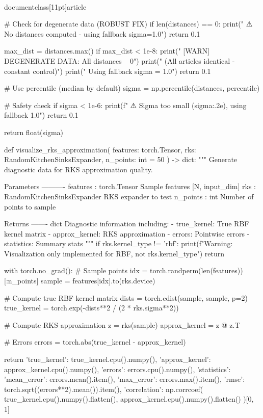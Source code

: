 \\documentclass[11pt]{article}
\begin{document}
\begin{CodeBlock}
    # Check for degenerate data (ROBUST FIX)
    if len(distances) == 0:
        print("  ⚠ No distances computed - using fallback sigma=1.0")
        return 0.1
    
    max_dist = distances.max()
    if max_dist < 1e-8:
        print("  [WARN] DEGENERATE DATA: All distances ~ 0")
        print("    (All articles identical - constant control)")
        print("    Using fallback sigma = 1.0")
        return 0.1
    
    # Use percentile (median by default)
    sigma = np.percentile(distances, percentile)
    
    # Safety check
    if sigma < 1e-6:
        print(f"  ⚠ Sigma too small ({sigma:.2e}), using fallback 1.0")
        return 0.1
    
    return float(sigma)


def visualize_rks_approximation(
    features: torch.Tensor,
    rks: RandomKitchenSinksExpander,
    n_points: int = 50
) -> dict:
    """
    Generate diagnostic data for RKS approximation quality.
    
    Parameters
    ----------
    features : torch.Tensor
        Sample features [N, input_dim]
    rks : RandomKitchenSinksExpander
        RKS expander to test
    n_points : int
        Number of points to sample
    
    Returns
    -------
    dict
        Diagnostic information including:
        - true_kernel: True RBF kernel matrix
        - approx_kernel: RKS approximation
        - errors: Pointwise errors
        - statistics: Summary stats
    """
    if rks.kernel_type != 'rbf':
        print(f"Warning: Visualization only implemented for RBF, not {rks.kernel_type}")
        return {}
    
    with torch.no_grad():
        # Sample points
        idx = torch.randperm(len(features))[:n_points]
        sample = features[idx].to(rks.device)
        
        # Compute true RBF kernel matrix
        dists = torch.cdist(sample, sample, p=2)
        true_kernel = torch.exp(-dists**2 / (2 * rks.sigma**2))
        
        # Compute RKS approximation
        z = rks(sample)
        approx_kernel = z @ z.T
        
        # Errors
        errors = torch.abs(true_kernel - approx_kernel)
        
        return {
            'true_kernel': true_kernel.cpu().numpy(),
            'approx_kernel': approx_kernel.cpu().numpy(),
            'errors': errors.cpu().numpy(),
            'statistics': {
                'mean_error': errors.mean().item(),
                'max_error': errors.max().item(),
                'rmse': torch.sqrt((errors**2).mean()).item(),
                'correlation': np.corrcoef(
                    true_kernel.cpu().numpy().flatten(),
                    approx_kernel.cpu().numpy().flatten()
                )[0, 1]
            }
        }



\end{CodeBlock}
\end{document}
